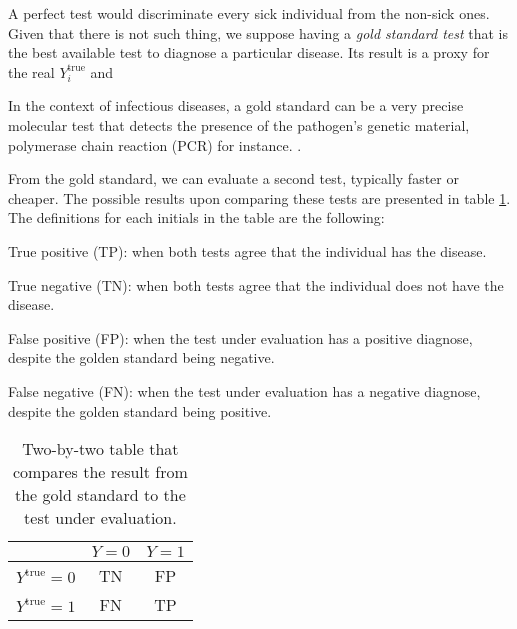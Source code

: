 A perfect test would discriminate every sick individual from the non-sick ones.
Given that there is not such thing, we suppose having a {\em gold standard
test} that is the best available test \cite{versi1992gold} to diagnose a
particular disease. Its result is a proxy for the real $Y^{\mathrm{true}}_i$ and 

\begin{citacao}
  In the context of infectious diseases, a gold standard can be a very precise
  molecular test that detects the presence of the pathogen’s genetic material,
  polymerase chain reaction (PCR) for instance. \cite[p. 125]{bastos2021modelling}.
\end{citacao}

From the gold standard, we can evaluate a second test, typically faster or
cheaper. The possible results upon comparing these tests are presented in
table \ref{table:two-by-two}. The definitions for each initials in the table
are the following: 

\begin{alineas}
  \item True positive (TP): when both tests agree that the individual has the
  disease. 
  \item True negative (TN): when both tests agree that the individual does not
  have the disease.
  \item False positive (FP): when the test under evaluation has a positive
  diagnose, despite the golden standard being negative. 
  \item False negative (FN): when the test under evaluation has a negative
  diagnose, despite the golden standard being positive.
\end{alineas}

\begin{table}[!ht]
  \centering
  \begin{tabular}{c|c|c|}
  \cline{2-3}
                                               & $Y = 0$ & $Y = 1$ \\ \hline
  \multicolumn{1}{|c|}{$Y^{\mathrm{true}}= 0$} & TN    & FP    \\ \hline
  \multicolumn{1}{|c|}{$Y^{\mathrm{true}}= 1$} & FN    & TP    \\ \hline
  \end{tabular}
  \caption{Two-by-two table that compares the result from the gold standard to
  the test under evaluation.}
  \label{table:two-by-two}
\end{table}

